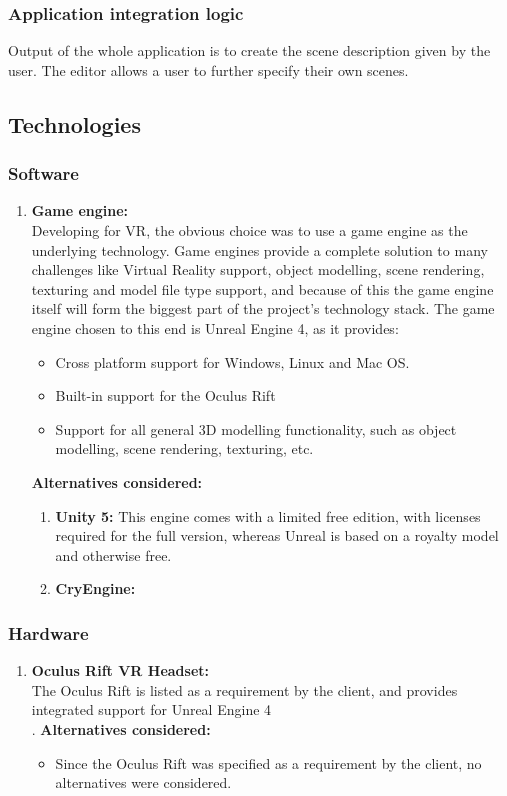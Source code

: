 \documentclass[a4paper,12pt]{article}
\begin{document}
\subsubsection{Application integration logic}
Output of the whole application is to create the scene description given by the user. The editor allows a user to further specify their own scenes.


\subsection{Technologies}
\subsubsection{Software}
\begin{enumerate}
	\item \textbf{Game engine:}\\
		Developing for VR, the obvious choice was to use a game engine as the underlying technology. Game engines provide a complete solution to many challenges like Virtual Reality support, object modelling, scene rendering, texturing and model file type support, and because of this the game engine itself will form the biggest part of the project's technology stack. The game engine chosen to this end is Unreal Engine 4, as it provides:
		\begin{itemize}
			\item Cross platform support for Windows, Linux and Mac OS.
			\item Built-in support for the Oculus Rift
			\item Support for all general 3D modelling functionality, such as object modelling, scene rendering, texturing, etc.
		\end{itemize}
		\textbf{Alternatives considered:}
		\begin{enumerate}
			\item \textbf{Unity 5:}  This engine comes with a limited free edition, with licenses required for the full version, whereas Unreal is based on a royalty model and otherwise free.%
			\item \textbf{CryEngine:} %
		\end{enumerate}
\end{enumerate}
\subsubsection{Hardware}
\begin{enumerate}
	\item \textbf{Oculus Rift VR Headset:}\\
		The Oculus Rift is listed as a requirement by the client, and provides integrated support for Unreal Engine 4\\.
		\textbf{Alternatives considered:}
		\begin{itemize}
			\item Since the Oculus Rift was specified as a requirement by the client, no alternatives were considered.
		\end{itemize}
\end{enumerate}
\newpage
%
%
\end{document}
